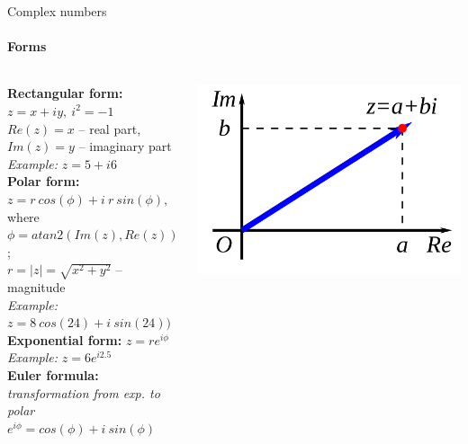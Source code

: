 \documentclass[aspectratio=169]{beamer}
\begin{document}
\begin{frame}[t]{Complex numbers}
    \framesubtitle{Forms}
    \vspace{-0.5cm}
    \begin{columns}[T,onlytextwidth]
        \begin{column}{0.55\textwidth}
            \textbf{Rectangular form:} $z=x+iy,\ i^2=-1 $\\
            $Re(z)=x$ -- real part, $Im(z)=y$ -- imaginary part \\
            \textit{Example:} $z=5 + i6$ \\
            \textbf{Polar form:} $z=r\ cos(\phi) + i\ r\ sin(\phi) $, where \\
            $\phi = atan2(Im(z),Re(z))$; \\
            $r = |z|=\sqrt{x^2+y^2}$ -- magnitude \\
            \textit{Example:} $z=8\ cos(24)+i\ sin(24))$ \\
            \textbf{Exponential form:} $z=re^{i \phi}$ \\
            \textit{Example:} $z=6e^{i 2.5}$ \\
            \textbf{Euler formula:} \textit{transformation from exp. to polar} \\
            $e^{i\phi} = cos(\phi) + i\ sin(\phi)$
        \end{column}
        \begin{column}{0.44\textwidth}
            \vspace{-0.8cm}
            \begin{minipage}{0.58\textwidth}
                \centering\includegraphics[width=\textwidth,keepaspectratio]{rectangular_form.png}

\end{minipage}
\end{column}
\end{columns}
\end{frame}
\end{document}

